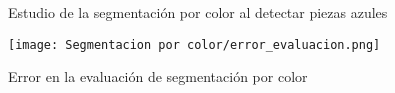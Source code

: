 \begin{figure}[ht]  %
  \hfill	
\caption{Estudio de la segmentación por color al detectar piezas azules}
\label{fig:blue colour}
\vspace{-5pt}
\end{figure}

\begin{figure}[ht]  %
	\centering
	\texttt{[image: Segmentacion por color/error\_evaluacion.png]}
	\caption{Error en la evaluación de segmentación por color}
	\label{fig:error entrenamiento}
\end{figure}
